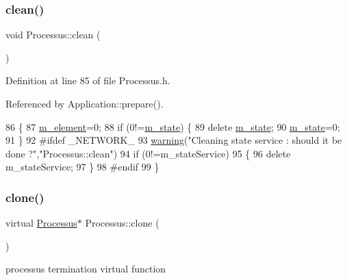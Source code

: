 \subsubsection{\texorpdfstring{clean()}{clean()}}
{\footnotesize\ttfamily void Processus\+::clean (\begin{DoxyParamCaption}{ }\end{DoxyParamCaption})\hspace{0.3cm}{\ttfamily [inline]}}



Definition at line 85 of file Processus.\+h.



Referenced by Application\+::prepare().


\begin{DoxyCode}
86   \{
87     \hyperlink{classProcessus_aa9d24d53c3e52f36786cabb5d8e296e7}{m\_element}=0;
88     \textcolor{keywordflow}{if} (0!=\hyperlink{classProcessus_ab3539eee42891ceae0baf4395ae7fb61}{m\_state}) \{
89       \textcolor{keyword}{delete} \hyperlink{classProcessus_ab3539eee42891ceae0baf4395ae7fb61}{m\_state};
90       \hyperlink{classProcessus_ab3539eee42891ceae0baf4395ae7fb61}{m\_state}=0;
91     \}
92 \textcolor{preprocessor}{#ifdef \_NETWORK\_
}
93     \hyperlink{classObject_a65cd4fda577711660821fd2cd5a3b4c9}{warning}(\textcolor{stringliteral}{"Cleaning state service : should it be done ?"},\textcolor{stringliteral}{"Processus::clean"})
94       if (0!=m\_stateService)
95       \{
96         \textcolor{keyword}{delete} m\_stateService;
97       \}
98 \textcolor{preprocessor}{#endif
}
99   \}
\end{DoxyCode}
\mbox{\label{classProcessus_aca8856f6d6d7b7e1fe941f298dcbb502}} 
\subsubsection{\texorpdfstring{clone()}{clone()}}
{\footnotesize\ttfamily virtual \hyperlink{classProcessus}{Processus}$\ast$ Processus\+::clone (\begin{DoxyParamCaption}{ }\end{DoxyParamCaption})\hspace{0.3cm}{\ttfamily [pure virtual]}}

processus termination virtual function 

